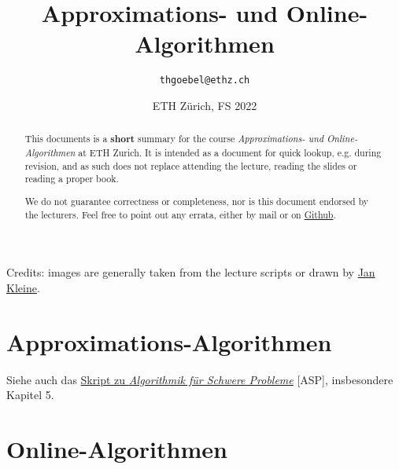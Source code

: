 \documentclass[paper=a4, parskip=half-]{scrartcl}
\title{Approximations- und Online-Algorithmen}
\author{\texttt{thgoebel@ethz.ch}}
\date{ETH Zürich, FS 2022}
\begin{document}
\begin{titlepage}
\maketitle
\vspace{5cm}
\thispagestyle{empty}


\begin{abstract}
This documents is a \textbf{short} summary for the course
\textit{Approximations- und Online-Algorithmen} at ETH Zurich.
It is intended as a document for quick lookup, e.g. during revision,
and as such does not replace attending the lecture, reading the slides or reading a proper book.

We do not guarantee correctness or completeness, nor is this document endorsed by the lecturers.
Feel free to point out any errata, either by mail or on
\href{https://github.com/eth-cs-student-summaries/Approximations-und-Online-Algorithmen}{Github}.
\end{abstract}

\end{titlepage}

\tableofcontents
\vspace{24mm}
\listoffigures

Credits: images are generally taken from the lecture scripts or drawn by
\href{mailto:jkleine@ethz.ch}{Jan Kleine}.

\newpage

\part{Approximations-Algorithmen}

Siehe auch das \href{https://github.com/eth-cs-student-summaries/Algorithmik-fuer-Schwere-Probleme/}
{Skript zu \emph{Algorithmik für Schwere Probleme}} [ASP], insbesondere Kapitel 5.


\newpage


\newpage


\newpage


\newpage

\newpage


\part{Online-Algorithmen}


\newpage


\newpage


\newpage


\newpage
\end{document}
